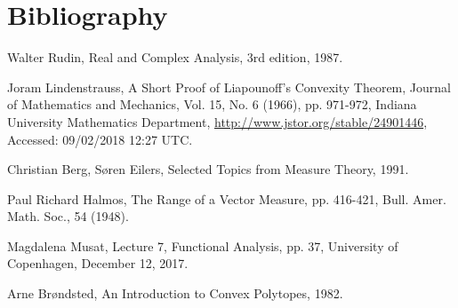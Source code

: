 \section{Bibliography}

\begin{thebibliography}{9}

	Walter Rudin,
	Real and Complex Analysis,
	3rd edition,
	1987.
	
	Joram Lindenstrauss,
	A Short Proof of Liapounoff's Convexity Theorem,
	Journal of Mathematics and Mechanics, Vol. 15, No. 6 (1966), pp. 971-972,
	Indiana University Mathematics Department,
	\url{http://www.jstor.org/stable/24901446},
	Accessed: 09/02/2018 12:27 UTC.
	
	Christian Berg, Søren Eilers,
	Selected Topics from Measure Theory,
	1991.
	
	Paul Richard Halmos,
	The Range of a Vector Measure, pp. 416-421,
	Bull. Amer. Math. Soc., 54 (1948).

	Magdalena Musat,
	Lecture 7, Functional Analysis, pp. 37,
	University of Copenhagen,
	December 12, 2017.
	
	Arne Brøndsted,
	An Introduction to Convex Polytopes,
	1982.

\end{thebibliography}